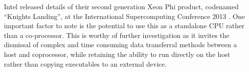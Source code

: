 \documentclass[runningheads,a4paper]{llncs}
\begin{document}
Intel released details of their second generation Xeon Phi product, codenamed “Knights Landing”,  at the International Supercomputing 
Conference 2013 \cite{knightlanding}. One important factor to note is the potential to use this as a standalone CPU rather than a co-processor. 
This is worthy of further investigation as it invites the dismissal of complex and time consuming data transferral methods between 
a host and coprocessor, while retaining the ability to run directly on the host rather than copying executables to an external device.
 



\end{document}
